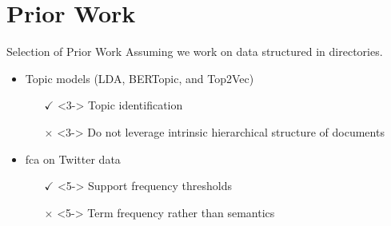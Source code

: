 \section{Prior Work}

\begin{frame}{Selection of Prior Work}
    Assuming we work on data structured in directories.
    \begin{itemize}
        \item<2-> Topic models (LDA, BERTopic, and Top2Vec)
        \begin{itemize}
            \item[$\checkmark$]<3-> Topic identification
            \item[$\times$]<3-> Do not leverage intrinsic hierarchical structure of documents
        \end{itemize}

        \item<4-> \acs{fca} on Twitter data~\cite{twitter_fca_2016}
        \begin{itemize}
            \item[$\checkmark$]<5-> Support frequency thresholds 
            \item[$\times$]<5-> Term frequency rather than semantics
        \end{itemize}
      
    \end{itemize}
\end{frame}



